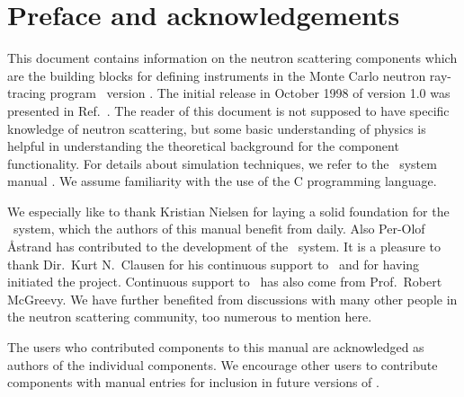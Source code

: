 
\chapter*{Preface and acknowledgements}
This document contains information on the neutron scattering components 
which are the building blocks for defining instruments 
in the Monte Carlo neutron
ray-tracing program \MCS\ version \version . The initial
release in October 1998 of version 1.0 was presented in Ref.~\cite{NNews}. 
The reader of this
document is not supposed to have specific knowledge of neutron scattering,
but some basic understanding of physics is helpful in
understanding the theoretical background for the component functionality. 
For details about simulation techniques, we refer to 
the \MCS\ system manual \cite{mcstasmanual}.
We assume familiarity with the use of 
the C programming language.

We especially like to thank Kristian Nielsen for laying a solid foundation
for the \MCS\ system, which the authors of this manual benefit from daily.
Also Per-Olof \AA strand has contributed to the development of
the \MCS\ system.
It is a pleasure to thank Dir.~Kurt N.~Clausen for his continuous
support to \MCS\ and for having initiated the project.
Continuous support to \MCS\ has also come from Prof.~Robert McGreevy.
We have further benefited
from discussions with many other people in the neutron scattering
community, too numerous to mention here.

The users who contributed components to this manual are acknowledged
as authors of the individual components. We encourage other
users to contribute components with manual entries for inclusion in
future versions of \MCS.

